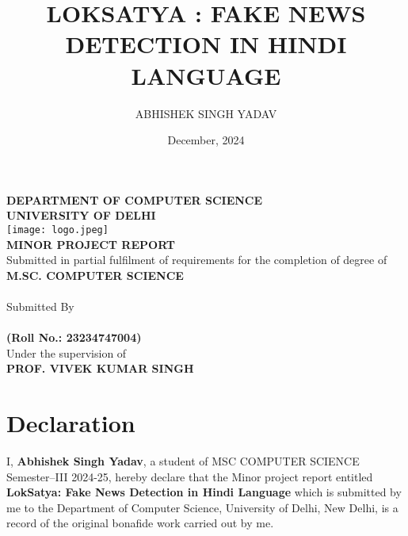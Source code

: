 \documentclass[12pt,a4paper]{report}
\title{LOKSATYA : FAKE NEWS DETECTION IN HINDI LANGUAGE}
\author{ABHISHEK SINGH YADAV}
\date{December, 2024}
\begin{document}
\begin{titlepage}
    \begin{center}
        \Large\textbf{DEPARTMENT OF COMPUTER SCIENCE} \\
        \Large\textbf{UNIVERSITY OF DELHI}\\
        \vspace{0.5cm}
        \texttt{[image: logo.jpeg]}\\
        \vspace{1cm}
        \Large\textbf{MINOR PROJECT REPORT}\\
        \vspace{1cm}
        \Large{Submitted in partial fulfilment of requirements for the completion of degree of}\\
        \vspace{0.3cm}
        \Large\textbf{M.SC. COMPUTER SCIENCE}\\
        \vspace{1cm}
        \Large\textbf{\thetitle}\\
        \vspace{0.5cm}
        \Large{Submitted By}\\
        \vspace{0.5cm}
        \Large\textbf{\theauthor}\\
        \Large\textbf{(Roll No.: 23234747004)}\\
        \vspace{0.5cm}
        \Large{Under the supervision of}\\
        \vspace{0.5cm}
        \Large\textbf{PROF. VIVEK KUMAR SINGH}\\
        \vspace{1cm}
        \Large{\textbf{\thedate}}
    \end{center}
    \thispagestyle{empty}
\end{titlepage}

\chapter*{Declaration}
I, \textbf{Abhishek Singh Yadav}, a student of MSC COMPUTER SCIENCE Semester–III 2024-25, hereby declare that the Minor project report entitled \textbf{LokSatya: Fake News Detection in Hindi Language} which is submitted by me to the Department of Computer Science, University of Delhi, New Delhi, is a record of the original bonafide work carried out by me.
\end{document}
